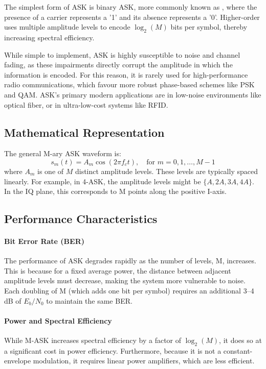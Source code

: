 The simplest form of ASK is binary ASK, more commonly known as , where the presence of a carrier represents a '1' and its absence represents a '0'. Higher-order  uses multiple amplitude levels to encode $\log_2(M)$ bits per symbol, thereby increasing spectral efficiency.

\begin{keyconcept}
    While simple to implement, ASK is highly susceptible to noise and channel fading, as these impairments directly corrupt the amplitude in which the information is encoded. For this reason, it is rarely used for high-performance radio communications, which favour more robust phase-based schemes like PSK and QAM. ASK's primary modern applications are in low-noise environments like optical fiber, or in ultra-low-cost systems like RFID.
\end{keyconcept}


\subsection{Mathematical Representation}

The general M-ary ASK waveform is:
\begin{equation}
    s_m(t) = A_m \cos(2\pi f_c t), \quad \text{for } m = 0, 1, \ldots, M-1
\end{equation}
where $A_m$ is one of $M$ distinct amplitude levels. These levels are typically spaced linearly. For example, in 4-ASK, the amplitude levels might be $\{A, 2A, 3A, 4A\}$. In the IQ plane, this corresponds to M points along the positive I-axis.


\subsection{Performance Characteristics}

\paragraph{Bit Error Rate (BER)}
The performance of ASK degrades rapidly as the number of levels, M, increases. This is because for a fixed average power, the distance between adjacent amplitude levels must decrease, making the system more vulnerable to noise. Each doubling of M (which adds one bit per symbol) requires an additional 3--4 dB of $E_b/N_0$ to maintain the same BER.

\paragraph{Power and Spectral Efficiency}
While M-ASK increases spectral efficiency by a factor of $\log_2(M)$, it does so at a significant cost in power efficiency. Furthermore, because it is not a constant-envelope modulation, it requires linear power amplifiers, which are less efficient.

